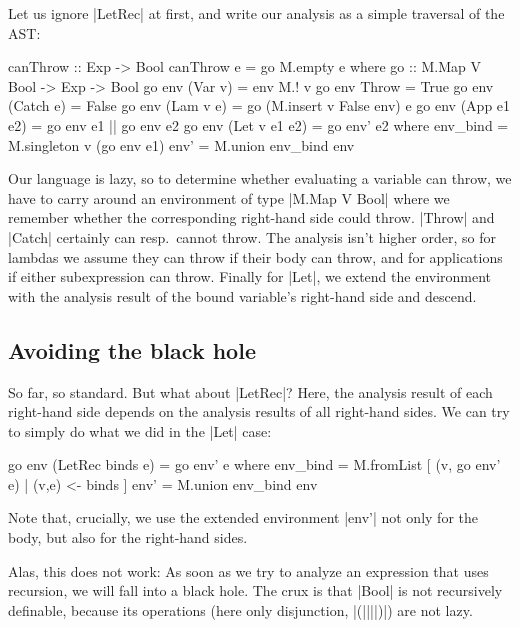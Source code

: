 \documentclass[manuscript,screen,acmsmall,nonacm]{acmart}
\begin{document}
Let us ignore |LetRec| at first, and write our analysis as a simple traversal of the AST:
\nopagebreak
\savecolumns
\begin{code}
canThrow :: Exp -> Bool
canThrow e = go M.empty e
  where
    go :: M.Map V Bool -> Exp -> Bool
    go env (Var v)        = env M.! v
    go env Throw          = True
    go env (Catch e)      = False
    go env (Lam v e)      = go (M.insert v False env) e
    go env (App e1 e2)    = go env e1 || go env e2
    go env (Let v e1 e2)  = go env' e2
      where
        env_bind  = M.singleton v (go env e1)
        env'      = M.union env_bind env
\end{code}

Our language is lazy, so to determine whether evaluating a variable can throw,
we have to carry around an
environment of type |M.Map V Bool| where we remember whether the corresponding right-hand side could throw. |Throw| and |Catch| certainly can resp.\ cannot throw. The analysis isn't higher order, so for lambdas we assume they can throw if their body can throw, and for applications if either subexpression can throw. Finally for |Let|, we extend the environment with the analysis result of the bound variable's right-hand side and descend.

\subsection{Avoiding the black hole}
So far, so standard. But what about |LetRec|? Here, the analysis result of each right-hand side depends on the analysis results of all right-hand sides. We can try to simply do what we did in the |Let| case:
\restorecolumns
\begin{code}
    go env (LetRec binds e) = go env' e
      where
        env_bind  = M.fromList [ (v, go env' e) | (v,e) <- binds ]
        env'      = M.union env_bind env
\end{code}
Note that, crucially, we use the extended environment |env'| not only for the body, but also for the right-hand sides.

Alas, this does not work: As soon as we try to analyze an expression that uses recursion, we will fall into a black hole. The crux is that |Bool| is not recursively definable, because its operations (here only disjunction, |(||||)|) are not lazy.
\end{document}
